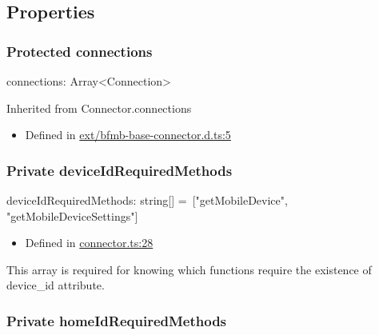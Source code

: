 \documentclass[]{article}
\providecommand{\tightlist}{%
  \setlength{\itemsep}{0pt}\setlength{\parskip}{0pt}}
\begin{document}
\hypertarget{properties-1}{%
\subsection{Properties}\label{properties-1}}

\protect\hypertarget{connections}{}{}

\hypertarget{protected-connections}{%
\subsubsection{\texorpdfstring{{Protected}
connections}{Protected connections}}\label{protected-connections}}

connections{:} {Array}{\textless{}}{Connection}{\textgreater{}}

Inherited from Connector.connections

\begin{itemize}
\tightlist
\item
  Defined in
  \href{https://github.com/BFMBFramework/TadoConnector/blob/f05932b/src/ext/bfmb-base-connector.d.ts\#L5}{ext/bfmb-base-connector.d.ts:5}
\end{itemize}

\protect\hypertarget{deviceidrequiredmethods}{}{}

\hypertarget{private-deviceidrequiredmethods}{%
\subsubsection{\texorpdfstring{{Private}
deviceIdRequiredMethods}{Private deviceIdRequiredMethods}}\label{private-deviceidrequiredmethods}}

deviceIdRequiredMethods{:} {string}{{[}{]}}{ =~{[}"getMobileDevice",
"getMobileDeviceSettings"{]}}

\begin{itemize}
\tightlist
\item
  Defined in
  \href{https://github.com/BFMBFramework/TadoConnector/blob/f05932b/src/connector.ts\#L28}{connector.ts:28}
\end{itemize}

This array is required for knowing which functions require the existence
of device\_id attribute.

\protect\hypertarget{homeidrequiredmethods}{}{}

\hypertarget{private-homeidrequiredmethods}{%
\subsubsection{\texorpdfstring{{Private}
homeIdRequiredMethods}{Private homeIdRequiredMethods}}\label{private-homeidrequiredmethods}}
\end{document}

